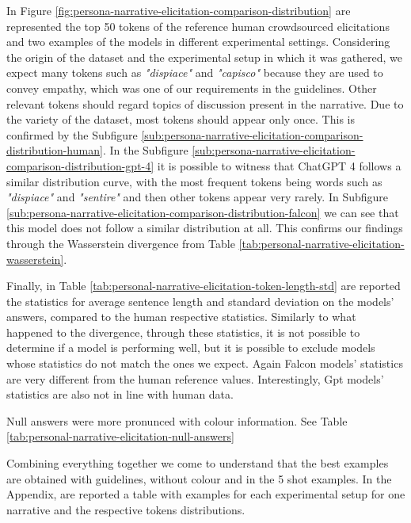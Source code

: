 In Figure \ref{fig:persona-narrative-elicitation-comparison-distribution} are represented the top 50 tokens of the reference human crowdsourced elicitations and two examples of the models in different experimental settings. Considering the origin of the dataset and the experimental setup in which it was gathered, we expect many tokens such as \emph{"dispiace"} and \emph{"capisco"} because they are used to convey empathy, which was one of our requirements in the guidelines. Other relevant tokens should regard topics of discussion present in the narrative. Due to the variety of the dataset, most tokens should appear only once. This is confirmed by the Subfigure \ref{sub:persona-narrative-elicitation-comparison-distribution-human}. 
In the Subfigure \ref{sub:persona-narrative-elicitation-comparison-distribution-gpt-4} it is possible to witness that ChatGPT 4 follows a similar distribution curve, with the most frequent tokens being words such as \emph{"dispiace"} and \emph{"sentire"} and then other tokens appear very rarely. 
In Subfigure \ref{sub:persona-narrative-elicitation-comparison-distribution-falcon} we can see that this model does not follow a similar distribution at all. This confirms our findings through the Wasserstein divergence from Table \ref{tab:personal-narrative-elicitation-wasserstein}.

% 
Finally, in Table \ref{tab:personal-narrative-elicitation-token-length-std} are reported the statistics for average sentence length and standard deviation on the models' answers, compared to the human respective statistics. Similarly to what happened to the divergence, through these statistics, it is not possible to determine if a model is performing well, but it is possible to exclude models whose statistics do not match the ones we expect. Again Falcon models' statistics are very different from the human reference values. Interestingly, Gpt models' statistics are also not in line with human data. 


Null answers were more pronunced with colour information. See Table \ref{tab:personal-narrative-elicitation-null-answers}

Combining everything together we come to understand that the best examples are obtained with guidelines, without colour and in the 5 shot examples. In the Appendix, are reported a table with examples for each experimental setup for one narrative and the respective tokens distributions.